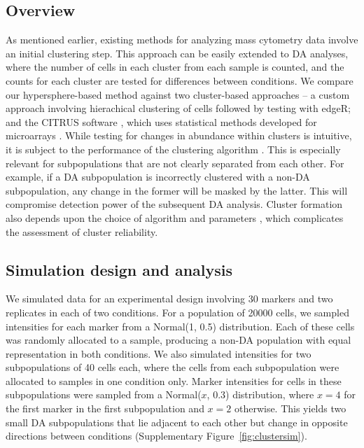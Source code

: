\documentclass{article}
\begin{document}
\subsection{Overview}
As mentioned earlier, existing methods for analyzing mass cytometry data involve an initial clustering step.
This approach can be easily extended to DA analyses, where the number of cells in each cluster from each sample is counted, and the counts for each cluster are tested for differences between conditions.
We compare our hypersphere-based method against two cluster-based approaches -- a custom approach involving hierachical clustering of cells followed by testing with edgeR; and the CITRUS software \cite{bruggner2014automated}, which uses statistical methods developed for microarrays \cite{tusher2001significance}.
While testing for changes in abundance within clusters is intuitive, it is subject to the performance of the clustering algorithm \cite{kerr2001bootstrapping,ronan2016avoiding}.
This is especially relevant for subpopulations that are not clearly separated from each other.
For example, if a DA subpopulation is incorrectly clustered with a non-DA subpopulation, any change in the former will be masked by the latter.
This will compromise detection power of the subsequent DA analysis.
Cluster formation also depends upon the choice of algorithm and parameters \cite{datta2003comparisons,wiwie2015comparing}, which complicates the assessment of cluster reliability.

\subsection{Simulation design and analysis}
We simulated data for an experimental design involving 30 markers and two replicates in each of two conditions.
For a population of 20000 cells, we sampled intensities for each marker from a Normal(1, 0.5) distribution.
Each of these cells was randomly allocated to a sample, producing a non-DA population with equal representation in both conditions.
We also simulated intensities for two subpopulations of 40 cells each, where the cells from each subpopulation were allocated to samples in one condition only.
Marker intensities for cells in these subpopulations were sampled from a Normal($x$, 0.3) distribution, where $x=4$ for the first marker in the first subpopulation and $x=2$ otherwise.
This yields two small DA subpopulations that lie adjacent to each other but change in opposite directions between conditions (Supplementary Figure~\ref{fig:clustersim}).
\end{document}
